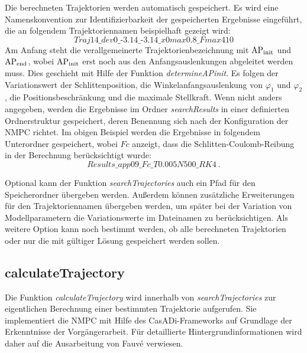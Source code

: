 Die berechneten Trajektorien werden automatisch gespeichert. Es wird eine Namenskonvention zur Identifizierbarkeit der gespeicherten Ergebnisse eingeführt, die an folgendem Trajektoriennamen beispielhaft gezeigt wird:
	\[
	\textit{Traj14\_dev0\_-3.14\_-3.14\_x0max0.8\_Fmax410}
\]
Am Anfang steht die verallgemeinerte Trajektorienbezeichnung mit $\mathrm{AP_{init}}$ und $\mathrm{AP_{end}}$, wobei $\mathrm{AP_{init}}$ erst noch aus den Anfangsauslenkungen abgeleitet werden muss. Dies geschieht mit Hilfe der Funktion \textit{determineAPinit}. Es folgen der Variationswert der Schlittenposition, die Winkelanfangsauslenkung von $\varphi_1$ und $\varphi_2$, die Positionsbeschränkung und die maximale Stellkraft. 
Wenn nicht anders angegeben, werden die Ergebnisse im Ordner \textit{searchResults} in einer definierten Ordnerstruktur gespeichert, deren Benennung sich nach der Konfiguration der NMPC richtet. Im obigen Beispiel werden die Ergebnisse in folgendem Unterordner gespeichert, wobei $Fc$ anzeigt, dass die Schlitten-Coulomb-Reibung in der Berechnung berücksichtigt wurde: 
	\[
	\textit{Results\_app09\_Fc\_T0.005N500\_RK4} \ .
\]

Optional kann der Funktion \textit{searchTrajectories} auch ein Pfad für den Speicherordner übergeben werden. Außerdem können zusätzliche Erweiterungen für den Trajektoriennamen übergeben werden, um später bei der Variation von Modellparametern die Variationswerte im Dateinamen zu berücksichtigen. 
Als weitere Option kann noch bestimmt werden, ob alle berechneten Trajektorien oder nur die mit gültiger Lösung gespeichert werden sollen. 


\subsection{calculateTrajectory}\label{subsec:calctrj}

Die Funktion \textit{calculateTrajectory} wird innerhalb von \textit{searchTrajectories} zur eigentlichen Berechnung einer bestimmten Trajektorie aufgerufen. Sie implementiert die NMPC mit Hilfe des CasADi-Frameworks auf Grundlage der Erkenntnisse der Vorgängerarbeit. Für detaillierte Hintergrundinformationen wird daher auf die Ausarbeitung von Fauvé \cite{fauve} verwiesen. 

